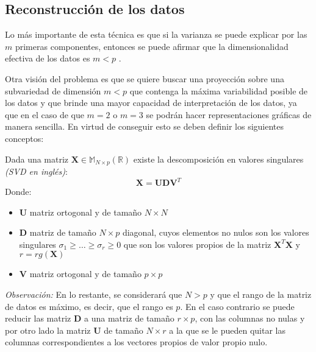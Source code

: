 \subsection{Reconstrucción de los datos}

\noindent Lo más importante de esta técnica es que si la varianza se puede explicar por las $m$ primeras componentes, entonces se puede afirmar que la dimensionalidad efectiva de los datos es $m<p$ \cite{Chatfield 1989}. 

\noindent Otra visión del problema es que se quiere buscar una proyección sobre una subvariedad de dimensión $m<p$ que contenga la máxima variabilidad posible de los datos y que brinde una mayor capacidad de interpretación de los datos, ya que en el caso de que $m=2$ o $m=3$ se podrán hacer representaciones gráficas de manera sencilla. En virtud de conseguir esto se deben definir los siguientes conceptos:

\begin{defi}
Dada una matriz $\textbf{X}\in  \mathbb{M}_{N\times p}(\mathbb{R})$ existe la descomposición en valores singulares \textit{(SVD en inglés)}:
\begin{equation}
\textbf{X}=\textbf{U}\mathbf{D}\textbf{V}^T
\end{equation}
Donde:
\begin{itemize}
\item \textbf{U} matriz ortogonal y de tamaño $N \times N$
\item $\mathbf{D}$ matriz de tamaño $N \times p $ diagonal, cuyos elementos no nulos son los valores singulares $\sigma_1\geq\ldots\geq \sigma_r\geq 0$ que son los valores propios de la matriz $\textbf{X}^T\textbf{X}$ y $r=rg(\textbf{X})$
\item \textbf{V} matriz ortogonal y de tamaño $p \times p$
\end{itemize}
\end{defi}

\noindent \emph{Observación: }En lo restante, se considerará que $N>p$ y que el rango de la matriz de datos es máximo, es decir, que el rango es $p$. En el caso contrario se puede reducir las matriz $\mathbf{D}$ a una matriz de tamaño $r\times p$, con las columnas no nulas y por otro lado la matriz $\mathbf{U}$ de tamaño $N\times r$ a la que se le pueden quitar las columnas correspondientes a los vectores propios de valor propio nulo. 

